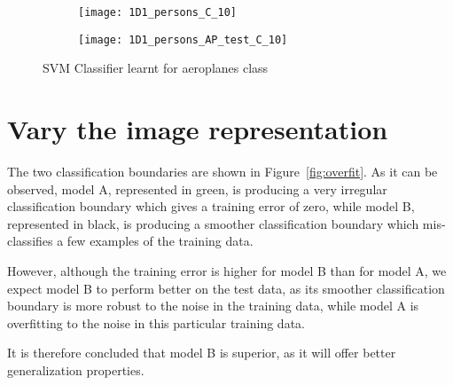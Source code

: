 \documentclass{article}
\begin{document}
\begin{figure}[ht!]
	\centering
	\begin{subfigure}[b]{\textwidth}
		\centering
		\texttt{[image: 1D1\_persons\_C\_10]}
		\label{fig_1D1_persons_a}
	\end{subfigure}
	\begin{subfigure}[b]{\textwidth}
		\centering
		\texttt{[image: 1D1\_persons\_AP\_test\_C\_10]}
		\label{fig_1D1_persons_b}
	\end{subfigure}
	\caption{SVM Classifier learnt for aeroplanes class}
	\label{fig_1D1_persons}
\end{figure}

\clearpage
{}



\section{Vary the image representation}



\clearpage

The two classification boundaries are shown in Figure~\ref{fig:overfit}. As it can be observed, model A, represented in green, is producing a very irregular classification boundary which gives a training error of zero, while model B, represented in black, is producing a smoother classification boundary which mis-classifies a few examples of the training data.

However, although the training error is higher for model B than for model A, we expect model B to perform better on the test data, as its smoother classification boundary is more robust to the noise in the training data, while model A is overfitting to the noise in this particular training data.

It is therefore concluded that model B is superior, as it will offer better generalization properties.

\end{document}
